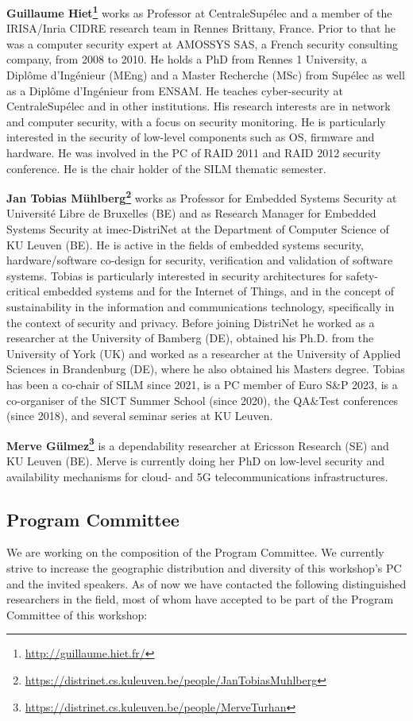 \documentclass[a4paper,11pt]{article}
\begin{document}
\textbf{Guillaume Hiet\footnote{\url{http://guillaume.hiet.fr/}}} works as
Professor at CentraleSupélec and a member of the IRISA/Inria CIDRE research
team in Rennes Brittany, France. Prior to that he was a computer security
expert at AMOSSYS SAS, a French security consulting company, from 2008 to
2010. He holds a PhD from Rennes 1 University, a Diplôme d'Ingénieur (MEng)
and a Master Recherche (MSc) from Supélec as well as a Diplôme d'Ingénieur
from ENSAM. He teaches cyber-security at CentraleSupélec and in other
institutions. His research interests are in network and computer security,
with a focus on security monitoring. He is particularly interested in the
security of low-level components such as OS, firmware and hardware. He was
involved in the PC of RAID 2011 and RAID 2012 security conference. He is
the chair holder of the SILM thematic semester.

\textbf{Jan Tobias
M\"uhlberg\footnote{\url{https://distrinet.cs.kuleuven.be/people/JanTobiasMuhlberg}}}
works as Professor for Embedded Systems Security at Universit\'e Libre de
Bruxelles (BE) and as Research Manager for Embedded Systems Security at
imec-DistriNet at the Department of Computer Science of KU Leuven (BE). He
is active in the fields of embedded systems security, hardware/software
co-design for security, verification and validation of software systems.
Tobias is particularly interested in security architectures for
safety-critical embedded systems and for the Internet of Things, and in the
concept of sustainability in the information and communications technology,
specifically in the context of security and privacy. Before joining
DistriNet he worked as a researcher at the University of Bamberg (DE),
obtained his Ph.D. from the University of York (UK) and worked as a
researcher at the University of Applied Sciences in Brandenburg (DE), where
he also obtained his Masters degree. Tobias has been a co-chair of SILM
since 2021, is a PC member of Euro S\&P 2023, is a co-organiser of the SICT
Summer School (since 2020), the QA\&Test conferences (since 2018), and
several seminar series at KU Leuven.

\textbf{Merve
G\"ulmez\footnote{\url{https://distrinet.cs.kuleuven.be/people/MerveTurhan}}}
is a dependability researcher at Ericsson Research (SE) and KU Leuven (BE).
Merve is currently doing her PhD on low-level security and availability
mechanisms for cloud- and 5G telecommunications infrastructures.


\subsection{Program Committee}
%
We are working on the composition of the Program Committee. We currently
strive to increase the geographic distribution and diversity of this
workshop's PC and the invited speakers. As of now we have contacted the
following distinguished researchers in the field, most of whom have
accepted to be part of the Program Committee of this workshop:
\end{document}
